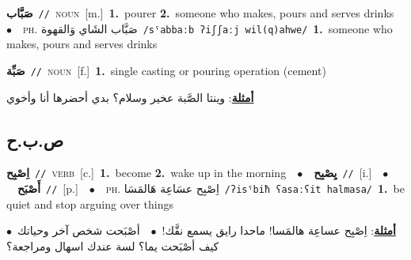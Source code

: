 \documentclass[10pt,a4paper,twoside]{article} %
\begin{document}
\begin{multicols}{2}
{{{{\setlength\topsep{0pt}\textbf{\foreignlanguage{arabic}{صَبَّاب}}\ {\color{gray}\texttt{//}\color{black}}\ \textsc{noun}\ [m.]\ \textbf{1.}~pourer  \textbf{2.}~someone who makes, pours and serves drinks\ \ $\bullet$\ \ \textsc{ph.} \color{gray} \foreignlanguage{arabic}{صَبَّاب الشَاي وَالقهوة}\color{black}\ {\color{gray}\texttt{/{\sffamily sˤabbaːb ʔiʃʃaːj wil(q)ahwe}/}\color{black}}\ \textbf{1.}~someone who makes, pours and serves drinks\ 

{\setlength\topsep{0pt}\textbf{\foreignlanguage{arabic}{صَبِّة}}\ {\color{gray}\texttt{//}\color{black}}\ \textsc{noun}\ [f.]\ \textbf{1.}~single casting or pouring operation (cement)\  \begin{flushright}\color{gray}\foreignlanguage{arabic}{\textbf{\underline{\foreignlanguage{arabic}{أمثلة}}}: وينتا الصَّبة عخير وسلام؟ بدي أحضرها أنا وأخوي}\end{flushright}\color{black}} \vspace{2mm}

\vspace{-3mm}
\subsection*{\color{blue}\foreignlanguage{arabic}{ص.ب.ح}\color{blue}{}} 

{\setlength\topsep{0pt}\textbf{\foreignlanguage{arabic}{اِصْبِح}}\ {\color{gray}\texttt{//}\color{black}}\ \textsc{verb}\ [c.]\ \textbf{1.}~become  \textbf{2.}~wake up in the morning\ \ $\bullet$\ \ \setlength\topsep{0pt}\textbf{\foreignlanguage{arabic}{يِصْبِح}}\ {\color{gray}\texttt{//}\color{black}}\ [i.]\ \ $\bullet$\ \ \setlength\topsep{0pt}\textbf{\foreignlanguage{arabic}{أَصْبَح}}\ {\color{gray}\texttt{//}\color{black}}\ [p.]\ \ $\bullet$\ \ \textsc{ph.} \color{gray} \foreignlanguage{arabic}{اِصْبِح عسَاعِة هَالمَسَا}\color{black}\ {\color{gray}\texttt{/{\sffamily ʔisˤbiħ ʕasaːʕit halmasa}/}\color{black}}\ \textbf{1.}~be quiet and stop arguing over things\  \begin{flushright}\color{gray}\foreignlanguage{arabic}{\textbf{\underline{\foreignlanguage{arabic}{أمثلة}}}: اِصْبِح عساعِة هالمَسا! ماحدا رايق يسمع نقَّك!\ $\bullet$\ \  أصْبَحت شخص آخر وحياتك\ $\bullet$\ \  كيف أصْبَحت يما؟ لسة عندك اسهال ومراجعة؟}\end{flushright}\color{black}} \vspace{2mm}

}}}}
\end{multicols}
\end{document}
